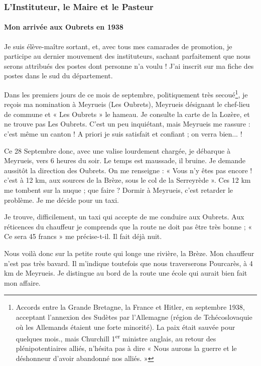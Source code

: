 
\subsubsection{L'Instituteur, le Maire et le Pasteur}

\paragraph{Mon arrivée aux Oubrets en 1938}

Je suis élève-maître sortant, et, avec tous mes camarades de promotion, je participe au dernier mouvement des instituteurs, sachant parfaitement que nous serons attribués des postes dont personne n'a voulu ! J'ai inscrit sur ma fiche des postes dans le sud du département.

Dans les premiers jours de ce mois de septembre, politiquement très secoué\footnote{Accords entre la Grande Bretagne, la France et Hitler, en septembre 1938, acceptant l'annexion des Sudètes par l'Allemagne (région de Tchécoslovaquie où les Allemands étaient une forte minorité). La paix était sauvée pour quelques mois., mais Churchill 1\textsuperscript{er} ministre anglais, au retour des plénipotentiaires alliés, n'hésita pas à dire « Nous aurons la guerre et le déshonneur d'avoir abandonné nos alliés. »}, je reçois ma nomination à Meyrueis (Les Oubrets), Meyrueis désignant le chef-lieu de commune et « Les Oubrets » le hameau. Je consulte la carte de la Lozère, et ne trouve pas Les Oubrets. C'est un peu inquiétant, mais Meyrueis me rassure : c'est même un canton ! A priori je suis satisfait et confiant ; on verra bien... !

Ce 28 Septembre donc, avec une valise lourdement chargée, je débarque à Meyrueis, vers 6 heures du soir. Le temps est maussade, il bruine. Je demande aussitôt la direction des Oubrets. On me renseigne : « Vous n'y êtes pas encore ! c'est à 12 km, aux sources de la Brèze, sous le col de la Serreyrède ». Ces 12 km me tombent sur la nuque ; que faire ? Dormir à Meyrueis, c'est retarder le problème. Je me décide pour un taxi.

Je trouve, difficilement, un taxi qui accepte de me conduire aux Oubrets. Aux réticences du chauffeur je comprends que la route ne doit pas être très bonne ; « Ce sera 45 francs » me précise-t-il. Il fait déjà nuit.

Nous voilà donc sur la petite route qui longe une rivière, la Brèze. Mon chauffeur n'est pas très bavard. Il m'indique toutefois que nous traverserons Pourcarès, à 4 km de Meyrueis. Je distingue au bord de la route une école qui aurait bien fait mon affaire.

